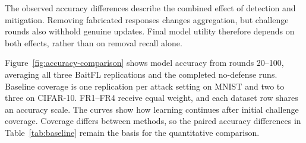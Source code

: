 \documentclass[conference]{IEEEtran}
\begin{document}


The observed accuracy differences describe the combined effect of detection and
mitigation. Removing fabricated responses changes aggregation, but
challenge rounds also withhold genuine updates. Final model utility
therefore depends on both effects, rather than on removal recall alone.

Figure~\ref{fig:accuracy-comparison} shows model accuracy from rounds
20--100, averaging all three BaitFL replications and the completed
no-defense runs. Baseline coverage is one replication per attack setting
on MNIST and two to three on CIFAR-10. FR1--FR4 receive equal weight,
and each dataset row shares an accuracy scale. The curves show how
learning continues after initial challenge coverage. Coverage differs
between methods, so the paired accuracy differences in
Table~\ref{tab:baseline} remain the basis for the quantitative comparison.
\end{document}
